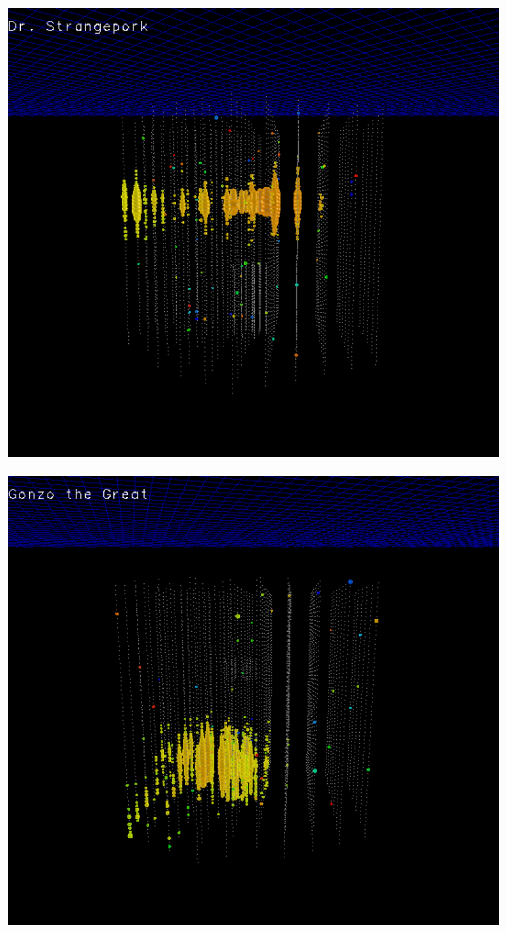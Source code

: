 \Tr
{}%
\begin{center}
\includegraphics[keepaspectratio,width=13cm]{dr-strangepork}
\end{center}

\newpage

\begin{center}
\includegraphics[keepaspectratio,width=13cm]{gonzo-the-great}
\end{center}


